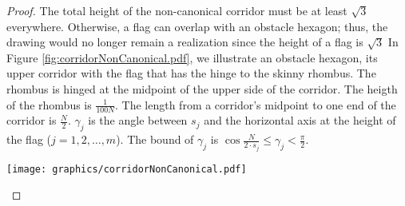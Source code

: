 \begin{proof}
The total height of the non-canonical corridor must be at least $\sqrt{3}$ everywhere.
Otherwise, a flag can overlap with an obstacle hexagon; thus, the drawing would no longer remain a realization since the height of a flag is $\sqrt{3}$
In Figure \ref{fig:corridorNonCanonical.pdf}, we illustrate an obstacle hexagon, its upper corridor with the flag that has the hinge to the skinny rhombus.  
The rhombus is hinged at the midpoint of the upper side of the corridor.
The heigth of the rhombus is $\frac{1}{100N}$.
The length from a corridor's midpoint to one end of the corridor is $\frac{N}{2}$.
$\gamma_j$ is the angle between $s_j$ and the horizontal axis at the height of the flag ($j = 1,2,\ldots, m$).
The bound of $\gamma_j$ is $\cos {\frac{N}{2\cdot s_j }} \leq \gamma_j < \frac{\pi}{2}$.

\begin{minipage}{\linewidth}
\begin{center}
\texttt{[image: graphics/corridorNonCanonical.pdf]}
\label{fig:corridorNonCanonical.pdf}
\end{center}
\end{minipage}


\end{proof}
